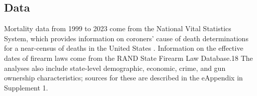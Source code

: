 \documentclass[,ijds,nonblindrev]{informs}
\begin{document}
\subsection{Data}\label{data}

Mortality data from 1999 to 2023 come from the National Vital Statistics
System, which provides information on coroners' cause of death
determinations for a near-census of deaths in the United States
\citep[\citet{cdc2024wonder}]{cdc2021wonder}. Information on the
effective dates of firearm laws come from the RAND State Firearm Law
Database.18 The analyses also include state-level demographic, economic,
crime, and gun ownership characteristics; sources for these are
described in the eAppendix in Supplement 1.

\begin{APPENDICES}


\end{APPENDICES}
\end{document}
